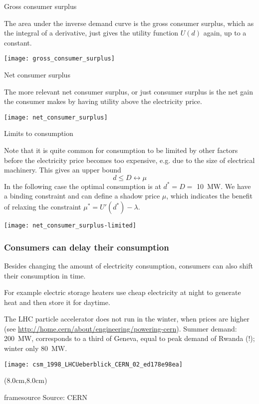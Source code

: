 \documentclass[10pt,dvipsnames]{beamer}
\def\l{\lambda}
\def\m{\mu}
\newcommand{\source}[1]{\begin{textblock*}{4cm}(8.0cm,8.0cm)
    \begin{beamercolorbox}[ht=0.5cm,right]{framesource}
        \usebeamerfont{framesource}\usebeamercolor[fg]{framesource} Source: {#1}
    \end{beamercolorbox}
\end{textblock*}}
\begin{document}
\begin{frame}{Gross consumer surplus}

  The area under the inverse demand curve is the \alert{gross consumer surplus},
  which as the integral of a derivative, just gives the utility
  function $U(d)$ again, up to a constant.

  \centering
  \texttt{[image: gross\_consumer\_surplus]}

\end{frame}



\begin{frame}{Net consumer surplus}

  The more relevant \alert{net consumer surplus}, or just
  \alert{consumer surplus} is the net gain the consumer makes by
  having utility above the electricity price.

  \centering
  \texttt{[image: net\_consumer\_surplus]}

\end{frame}


\begin{frame}{Limits to consumption}


  Note that it is quite common for consumption to be limited by other
  factors before the electricity price becomes too expensive, e.g. due
  to the size of electrical machinery. This gives an upper bound
  \begin{equation*}
    d \leq D  \leftrightarrow \m
  \end{equation*}
  In the following case the optimal consumption is at
  $d^* = D =$  10~MW. We have a \alert{binding} constraint and can define a \alert{shadow price} $\m$, which indicates the benefit of relaxing the constraint $\m^* = U'(d^*) - \l$.

  \centering
  \texttt{[image: net\_consumer\_surplus-limited]}

\end{frame}



\begin{frame}
  \frametitle{Consumers can delay their consumption}

  Besides changing the amount of electricity consumption, consumers
  can also shift their consumption in time.

  For example electric storage heaters use cheap electricity at night
  to generate heat and then store it for daytime.

  The LHC particle accelerator does not run in the winter,
  when prices are higher (see
  \url{http://home.cern/about/engineering/powering-cern}).  Summer
  demand: 200~MW, corresponds to a third of Geneva, equal to peak
  demand of Rwanda (!); winter only 80~MW.


  \centering
  \texttt{[image: csm\_1998\_LHCUeberblick\_CERN\_02\_ed178e98ea]}


  \source{CERN}



\end{frame}
\end{document}
